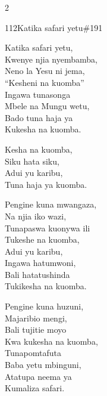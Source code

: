 \begin{multicols}{2}
\begin{hymn}{112}{Katika safari yetu}{\#191}
\begin{stanza}
Katika safari yetu,\\
Kwenye njia nyembamba,\\
Neno la Yesu ni jema,\\
``Kesheni na kuomba''\\
Ingawa tunasonga\\
Mbele na Mungu wetu,\\
Bado tuna haja ya\\
Kukesha na kuomba.
\end{stanza}
\begin{chorus}
Kesha na kuomba,\\
Siku hata siku,\\
Adui yu karibu,\\
Tuna haja ya kuomba.
\end{chorus}
\begin{stanza}
Pengine kuna mwangaza,\\
Na njia iko wazi,\\
Tunapaswa kuonywa ili\\
Tukeshe na kuomba,\\
Adui yu karibu,\\
Ingawa hatumwoni,\\
Bali hatatushinda\\
Tukikesha na kuomba.
\end{stanza}
\begin{stanza}
Pengine kuna huzuni,\\
Majaribio mengi,\\
Bali tujitie moyo\\
Kwa kukesha na kuomba,\\
Tunapomtafuta\\
Baba yetu mbinguni,\\
Atatupa neema ya\\
Kumaliza safari.
\end{stanza}
\end{hymn}


\end{multicols}
